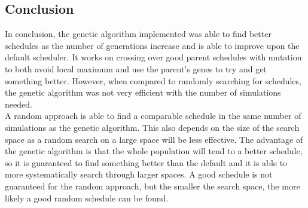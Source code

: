 \documentclass{article}
\newcommand{\n}[0]{\\[\baselineskip]}
\begin{document}
\subsection{Conclusion}
In conclusion, the genetic algorithm implemented was able to find better schedules as the number of generations increase and is able to improve upon the default scheduler. It works on crossing over good parent schedules with mutation to both avoid local maximum and use the parent's genes to try and get something better. However, when compared to randomly searching for schedules, the genetic algorithm was not very efficient with the number of simulations needed. 
\n
A random approach is able to find a comparable schedule in the same number of simulations as the genetic algorithm. This also depends on the size of the search space as a random search on a large space will be less effective. The advantage of the genetic algorithm is that the whole population will tend to a better schedule, so it is guaranteed to find something better than the default and it is able to more systematically search through larger spaces. A good schedule is not guaranteed for the random approach, but the smaller the search space, the more likely a good random schedule can be found.

\printbibliography
\end{document}
